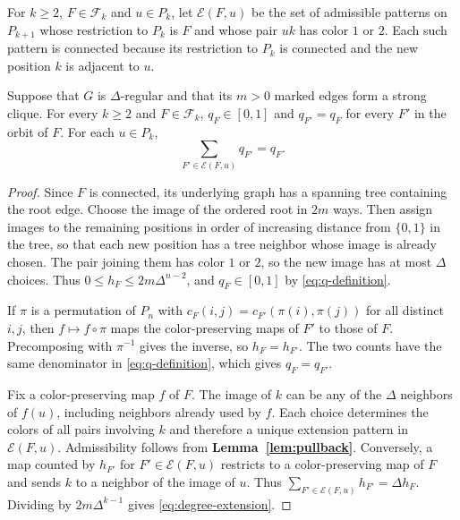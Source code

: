 For $k\geq2$, $F\in\mathcal F_k$ and $u\in P_k$, let
$\mathcal E(F,u)$ be the set of admissible patterns on $P_{k+1}$ whose
restriction to $P_k$ is $F$ and whose pair $uk$ has color $1$ or $2$.
Each such pattern is connected because its restriction to $P_k$ is
connected and the new position $k$ is adjacent to $u$.

\begin{lemma}\label{lem:coordinates}\label{lem:degree}
Suppose that $G$ is $\Delta$-regular and that its $m>0$ marked edges
form a strong clique. For every $k\geq2$ and $F\in\mathcal F_k$,
$q_F\in[0,1]$ and $q_{F'}=q_F$ for every $F'$ in the orbit of $F$.
For each $u\in P_k$,
\begin{equation}\label{eq:degree-extension}
 \sum_{F'\in\mathcal E(F,u)}q_{F'}=q_F.
\end{equation}
\end{lemma}

\begin{proof}
Since $F$ is connected, its underlying graph has a spanning tree
containing the root edge. Choose the image of the ordered root in
$2m$ ways. Then assign images to the remaining positions in order of
increasing distance from $\{0,1\}$ in the tree, so that each new
position has a tree neighbor whose image is already chosen. The pair
joining them has color $1$ or $2$, so the new image has at most
$\Delta$ choices. Thus $0\leq h_F\leq 2m\Delta^{n-2}$, and
$q_F\in[0,1]$ by \eqref{eq:q-definition}.

If $\pi$ is a permutation of $P_n$ with
$c_F(i,j)=c_{F'}(\pi(i),\pi(j))$ for all distinct $i,j$, then
$f\mapsto f\circ\pi$ maps the color-preserving maps of $F'$ to those
of $F$. Precomposing with $\pi^{-1}$ gives the inverse, so
$h_F=h_{F'}$. The two counts have the same denominator in
\eqref{eq:q-definition}, which gives $q_F=q_{F'}$.

Fix a color-preserving map $f$ of $F$. The image of $k$ can be any
of the $\Delta$ neighbors of $f(u)$, including neighbors already
used by $f$. Each choice determines the colors of all pairs involving
$k$ and therefore a unique extension pattern in $\mathcal E(F,u)$.
Admissibility follows from \textbf{Lemma~\ref{lem:pullback}}.
Conversely, a map counted by $h_{F'}$ for $F'\in\mathcal E(F,u)$
restricts to a color-preserving map of $F$ and sends $k$ to a neighbor
of the image of $u$. Thus
$\sum_{F'\in\mathcal E(F,u)}h_{F'}=\Delta h_F$.
Dividing by $2m\Delta^{k-1}$ gives \eqref{eq:degree-extension}.
\end{proof}


